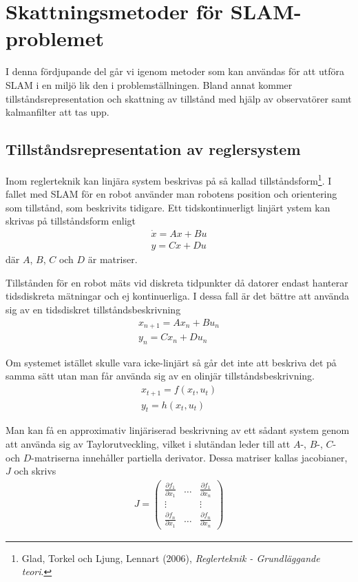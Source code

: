 \documentclass[a4paper,12pt,fleqn]{article}
\begin{document}
\newpage
\section{Skattningsmetoder för SLAM-problemet}
I denna fördjupande del går vi igenom metoder som kan användas för att utföra SLAM i en miljö lik den i problemställningen. Bland annat kommer tillståndsrepresentation och skattning av tillstånd med hjälp av observatörer samt kalmanfilter att tas upp.


\subsection{Tillståndsrepresentation av reglersystem}

Inom reglerteknik kan linjära system beskrivas på så kallad tillståndsform\footnote{Glad, Torkel och Ljung, Lennart (2006), \textit{Reglerteknik - Grundläggande teori}.}. I fallet med SLAM för en robot använder man robotens position och orientering som tillstånd, som beskrivits tidigare. Ett tidskontinuerligt linjärt ystem kan skrivas på tillståndsform enligt
\begin{gather}
\dot{x}=Ax+Bu \\
y=Cx+Du	
\label{equ:tillstand}
\end{gather}
där $A$, $B$, $C$ och $D$ är matriser.

Tillstånden för en robot mäts vid diskreta tidpunkter då datorer endast hanterar tidsdiskreta mätningar och ej kontinuerliga. I dessa fall är det bättre att använda sig av en tidsdiskret tillståndsbeskrivning
\begin{gather}
x_{n+1} = Ax_n + Bu_n \\
y_n = Cx_n + Du_n
\label{equ:disktillstand}
\end{gather}

Om systemet istället skulle vara icke-linjärt så går det inte att beskriva det på samma sätt utan man får använda sig av en olinjär tillståndsbeskrivning. 
\begin{gather}
	x_{t+1}=f(x_t,u_t)\\
	y_t=h(x_t,u_t)
\end{gather}

Man kan få en approximativ linjäriserad beskrivning av ett sådant system genom att använda sig av Taylorutveckling, vilket i slutändan leder till att $A$-, $B$-, $C$- och $D$-matriserna innehåller partiella derivator. Dessa matriser kallas jacobianer, $J$ och skrivs
\begin{gather}
	J= \begin{pmatrix}
	\frac{\partial f_1}{\partial x_1} & \dots & \frac{\partial f_1}{\partial x_n} \\
	  							\vdots &       & \vdots \\
	  \frac{\partial f_n}{\partial x_1} & \dots & \frac{\partial f_n}{\partial x_n}
	  \end{pmatrix}
	  \label{equ:jacobian}
\end{gather}
\end{document}
